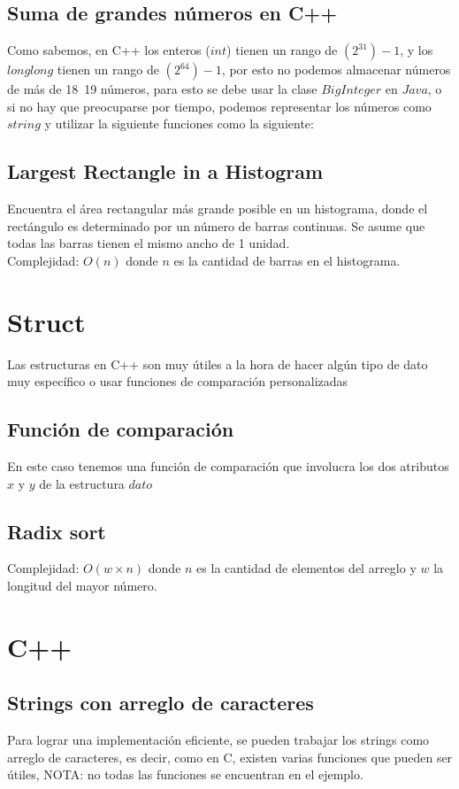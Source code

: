 \documentclass[10pt,letterpaper,twocolumn]{article}
\newcommand{\source}[1]{
	
	\dotfill
}
\begin{document}
	\subsection{Suma de grandes números en C++}
		Como sabemos, en C++ los enteros ($int$) tienen un rango de $(2^31)-1$, y los $long long$ tienen un rango de $(2^64)-1$, por esto no podemos almacenar números de más de 18~19 números, para esto se debe usar la clase $BigInteger$ en $Java$, o si no hay que preocuparse por tiempo, podemos representar los números como $string$ y utilizar la siguiente funciones como la siguiente:
		\source{./src/bigIntegerCpp.cpp}
	\subsection{Largest Rectangle in a Histogram}
		Encuentra el área rectangular más grande posible en un histograma, donde el rectángulo es determinado por un número de barras continuas. Se asume que todas las barras tienen el mismo ancho de 1 unidad. \\
		Complejidad: $O(n)$ donde $n$ es la cantidad de barras en el histograma.
		\source{./src/largest_rectangle.cpp}



\section{Struct}
	Las estructuras en C++ son muy útiles a la hora de hacer algún tipo de dato muy específico o usar funciones de comparación personalizadas
	\subsection{Función de comparación}
	En este caso tenemos una función de comparación que involucra los dos atributos $x$ y $y$ de la estructura $dato$
	\source{./src/struct.cpp}
	\subsection{Radix sort}
	Complejidad: $O(w \times n)$ donde $n$ es la cantidad de elementos del arreglo y $w$ la longitud del mayor número.\\
	\source{./src/radixSort.cpp}

\section{C++}
	\subsection{Strings con arreglo de caracteres}
	Para lograr una implementación eficiente, se pueden trabajar los strings como arreglo de caracteres, es decir, como en C, existen varias funciones que pueden ser útiles, NOTA: no todas las funciones se encuentran en el ejemplo.
	\source{./src/getsScanfGetline.cpp}
\end{document}
